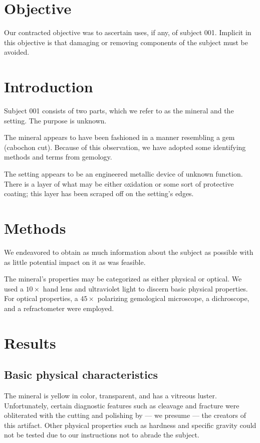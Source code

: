 \documentclass[10pt]{article}
\begin{document}
\maketitle


\section{Objective}
Our contracted objective was to ascertain uses, if any, of subject 001.
Implicit in this objective is that damaging or removing components of the subject must be avoided.

\section{Introduction}

Subject 001 consists of two parts, which we refer to as the mineral and the setting.
The purpose is unknown.

The mineral appears to have been fashioned in a manner resembling a gem (cabochon cut).
Because of this observation, we have adopted some identifying methods and terms from gemology.

The setting appears to be an engineered metallic device of unknown function.
There is a layer of what may be either oxidation or some sort of protective coating; this layer has been scraped off on the setting's edges.

\section{Methods}
We endeavored to obtain as much information about the subject as possible with as little potential impact on it as was feasible.

The mineral's properties may be categorized as either physical or optical.
We used a $10\times$ hand lens and ultraviolet light to discern basic physical properties.
For optical properties, a $45\times$ polarizing gemological microscope, a dichroscope, and a refractometer were employed.

\section{Results}

\subsection{Basic physical characteristics}
The mineral is yellow in color, transparent, and has a vitreous luster.
Unfortunately, certain diagnostic features such as cleavage and fracture were obliterated with the cutting and polishing by --- we presume --- the creators of this artifact.
Other physical properties such as hardness and specific gravity could not be tested due to our instructions not to abrade the subject.
\end{document}
